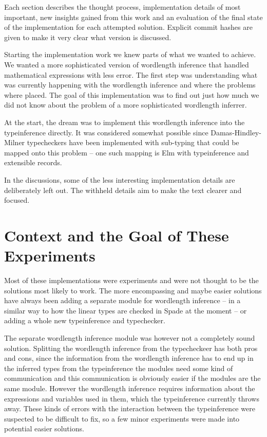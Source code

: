 \documentclass[msc,lith,english]{liuthesis}
\begin{document}
Each section describes the thought process, implementation details of most important, new insights gained from this work and an evaluation of the final state of the implementation for each attempted solution. Explicit commit hashes are given to make it very clear what version is discussed.

Starting the implementation work we knew parts of what we wanted to achieve. We wanted a more sophisticated version of wordlength inference that handled mathematical expressions with less error. The first step was understanding what was currently happening with the wordlength inference and where the problems where placed. The goal of this implementation was to find out just how much we did not know about the problem of a more sophisticated wordlength inferrer.

At the start, the dream was to implement this wordlength inference into the typeinference directly. It was considered somewhat possible since Damas-Hindley-Milner typecheckers have been implemented with sub-typing that could be mapped onto this problem -- one such mapping is Elm with typeinference and extensible records.

In the discussions, some of the less interesting implementation details are deliberately left out. The withheld details aim to make the text clearer and focused.

\section{Context and the Goal of These Experiments}
Most of these implementations were experiments and were not thought to be the solutions most likely to work. The more encompassing and maybe easier solutions have always been adding a separate module for wordlength inference -- in a similar way to how the linear types are checked in Spade at the moment -- or adding a whole new typeinference and typechecker.

The separate wordlength inference module was however not a completely sound solution. Splitting the wordlength inference from the typecheckeer has both pros and cons, since the information from the wordlength inference has to end up in the inferred types from the typeinference the modules need some kind of communication and this communication is obviously easier if the modules are the same module. However the wordlength inference requires information about the expressions and variables used in them, which the typeinference currently throws away. These kinds of errors with the interaction between the typeinference were suspected to be difficult to fix, so a few minor experiments were made into potential easier solutions.
\end{document}
